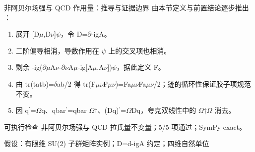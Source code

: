 \begin{frame}[t]{非阿贝尔场强与 QCD 作用量：推导与证据边界}
\footnotesize
{}\quad 由本节定义与前置结论逐步推出 ：
\begin{enumerate}
\item 展开 [D\ensuremath{\mu},D\ensuremath{\nu}]\ensuremath{\psi}，令 D=\ensuremath{\partial}-igA。
\item 二阶偏导相消，导数作用在 \ensuremath{\psi} 上的交叉项也相消。
\item 剩余 -ig(\ensuremath{\partial}\ensuremath{\mu}A\ensuremath{\nu}-\ensuremath{\partial}\ensuremath{\nu}A\ensuremath{\mu}-ig[A\ensuremath{\mu},A\ensuremath{\nu}])\ensuremath{\psi}，据此定义 F。
\item 由 tr(tatb)=\ensuremath{\delta}ab/\allowbreak{}2 得 tr(F\ensuremath{\mu}\ensuremath{\nu}F\ensuremath{\mu}\ensuremath{\nu})=Fa\ensuremath{\mu}\ensuremath{\nu}Fa\ensuremath{\mu}\ensuremath{\nu}/\allowbreak{}2；迹的循环性保证胶子项规范不变。
\item 因 q\ensuremath{^{\prime}}=\ensuremath{\Omega}q、qbar\ensuremath{^{\prime}}=qbar \ensuremath{\Omega}†、(Dq)\ensuremath{^{\prime}}=\ensuremath{\Omega}Dq，夸克双线性中的 \ensuremath{\Omega}†\ensuremath{\Omega} 消去。
\end{enumerate}\begin{block}{可执行检查}
\quad 非阿贝尔场强与 QCD 拉氏量不变量；5/5 项通过；SymPy exact。
\par\scriptsize 假设：有限维 SU(2) 子群矩阵实例；D=d-igA 约定；四维自然单位
\end{block}
\end{frame}

